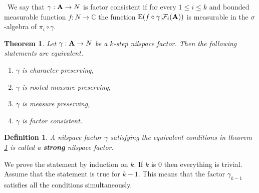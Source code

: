 \documentclass [11pt] {article}
\newtheorem{theorem}{Theorem}
\newtheorem{definition}{Definition}[section]
\def\bA{{\bf A}}
\begin{document}
~We say that $\gamma:\bA\rightarrow N$ is factor consistent if for every $1\leq i\leq k$ and bounded measurable function $f:N\rightarrow\mathbb{C}$ the function $\mathbb{E}(f\circ\gamma|\mathcal{F}_i(\bA))$ is measurable in the $\sigma$-algebra of $\pi_i\circ\gamma$.

\medskip

\begin{theorem}\label{charpres} Let $\gamma:\bA\rightarrow N$ be a $k$-step nilspace factor. Then the following statements are equivalent.
\begin{enumerate}
\item $\gamma$ is character preserving,
\item $\gamma$ is rooted measure preserving,
\item $\gamma$ is measure preserving,
\item $\gamma$ is factor consistent.
\end{enumerate}
\end{theorem} 

\begin{definition} A nilspace factor $\gamma$ satisfying the equivalent conditions in theorem \ref{charpres} is called a {\bf strong} nilspace factor. 
\end{definition}

\bigskip

 We prove the statement by induction on $k$. If $k$ is $0$ then everything is trivial. Assume that the statement is true for $k-1$. This means that the factor $\gamma_{k-1}$ satisfies all the conditions simultaneously.
\end{document}
